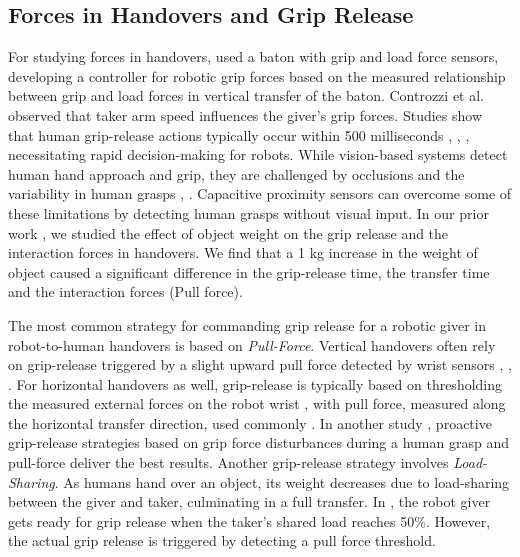 \subsection{Forces in Handovers and Grip Release}
For studying forces in handovers, \cite{chan_grip_from_load_second_PR2} used a baton with grip and load force sensors, developing a controller for robotic grip forces based on the measured relationship between grip and load forces in vertical transfer of the baton. Controzzi et al. \cite{human_human_to_human_robot_study_Controzzi} observed that taker arm speed influences the giver's grip forces.
Studies show that human grip-release actions typically occur within 500 milliseconds \cite{chan_grip_from_load_baton}, \cite{study_in_person_handover_for_baton}, \cite{human_human_to_human_robot_study_Controzzi}, necessitating rapid decision-making for robots. While vision-based systems detect human hand approach and grip, they are challenged by occlusions and the variability in human grasps \cite{many_grasp_types_7243327}, \cite{grasp_classification_vision_DBLP:conf/iros/YangPCF20}. Capacitive proximity sensors \cite{capacitive_sensors_grasp_detect_9560970} can overcome some of these limitations by detecting human grasps without visual input. In our prior work \cite{dataset-khanna}, we studied the effect of object weight on the grip release and the interaction forces in handovers. We find that a 1 kg increase in the weight of object caused a significant difference in the grip-release time, the transfer time and the interaction forces (Pull force).

The most common strategy for commanding grip release for a robotic giver in robot-to-human handovers is based on \textit{Pull-Force}.
Vertical handovers often rely on grip-release triggered by a slight upward pull force detected by wrist sensors \cite{chan_grip_from_load_baton}, \cite{chan_grip_from_load_second_PR2}, \cite{chan_grip_from_load_humanoid-6907004}. For horizontal handovers as well, grip-release is typically based on thresholding the measured external forces on the robot wrist \cite{human_human_to_human_robot_study_Controzzi}, with pull force, measured along the horizontal transfer direction, used commonly \cite{survey_review_2022_object_handovers}. In another study \cite{pull_proactive_strategy_8673085}, proactive grip-release strategies based on grip force disturbances during a human grasp and pull-force deliver the best results. 
Another grip-release strategy involves \textit{Load-Sharing}. As humans hand over an object, its weight decreases due to load-sharing between the giver and taker, culminating in a full transfer. In \cite{loadsharing_pull_strategy-10.3389/frobt.2021.672995, loadshare_strategy-7803296}, the robot giver gets ready for grip release when the taker's shared load reaches 50\%. However, the actual grip release is triggered by detecting a pull force threshold.

